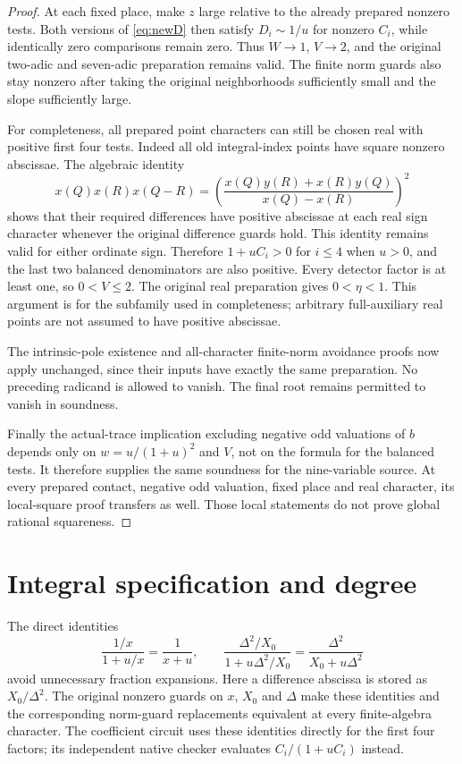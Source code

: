\documentclass[11pt,a4paper]{article}
\begin{document}
\begin{proof}
At each fixed place, make $z$ large relative to the already prepared
nonzero tests. Both versions of \eqref{eq:newD} then satisfy
$D_i\sim1/u$ for nonzero $C_i$, while identically zero comparisons
remain zero. Thus $W\to1$, $V\to2$, and the original two-adic and
seven-adic preparation remains valid. The finite norm guards also stay
nonzero after taking the original neighborhoods sufficiently small and
the slope sufficiently large.

For completeness, all prepared point characters can still be chosen
real with positive first four tests. Indeed all old integral-index
points have square nonzero abscissae. The algebraic identity
\[
 x(Q)x(R)x(Q-R)
   =\left(\frac{x(Q)y(R)+x(R)y(Q)}{x(Q)-x(R)}\right)^2
\]
shows that their required differences have positive abscissae at each
real sign character whenever the original difference guards hold.
This identity remains valid for either ordinate sign. Therefore
$1+uC_i>0$ for $i\le4$ when $u>0$, and the last two balanced
denominators are also positive. Every detector factor is at least one,
so $0<V\le2$. The original real preparation gives $0<\eta<1$.
This argument is for the subfamily used in completeness; arbitrary
full-auxiliary real points are not assumed to have positive abscissae.

The intrinsic-pole existence and all-character finite-norm avoidance
proofs now apply unchanged, since their inputs have exactly the same
preparation. No preceding radicand is allowed to vanish. The final
root remains permitted to vanish in soundness.

Finally the actual-trace implication excluding negative odd valuations
of $b$ depends only on $w=u/(1+u)^2$ and $V$, not on the formula for
the balanced tests. It therefore supplies the same soundness for the
nine-variable source. At every prepared contact, negative odd valuation,
fixed place and real character, its local-square proof transfers as
well. Those local statements do not prove global rational squareness.
\end{proof}

\section{Integral specification and degree}
The direct identities
\[
 \frac{1/x}{1+u/x}=\frac1{x+u},\qquad
 \frac{\Delta^2/X_0}{1+u\Delta^2/X_0}
                  =\frac{\Delta^2}{X_0+u\Delta^2}
\]
avoid unnecessary fraction expansions. Here a difference abscissa is
stored as $X_0/\Delta^2$. The original nonzero guards on $x$, $X_0$
and $\Delta$ make these identities and the corresponding norm-guard
replacements equivalent at every finite-algebra character.
The coefficient circuit uses these identities directly for the first
four factors; its independent native checker evaluates
$C_i/(1+uC_i)$ instead.
\end{document}
